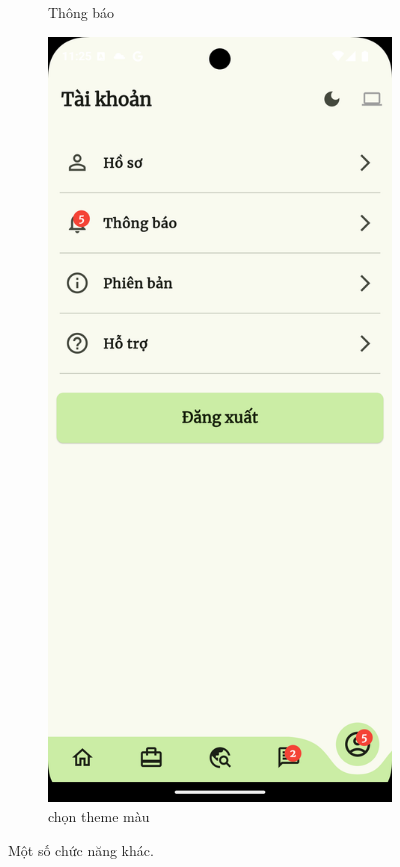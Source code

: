 \begin{figure}[H]
\begin{subfigure}{0.326\textwidth}
        \caption{Thông báo}
        \label{fig:func_noti}
    \end{subfigure}
    \hfill
    \begin{subfigure}{0.326\textwidth}
        \includegraphics[width=1\linewidth]{figures/c4/system_func/theme.png}
        \caption{chọn theme màu}
        \label{fig:func_theme}
    \end{subfigure}
    \caption{Một số chức năng khác.}
    \label{fig:other-functions}
\end{figure}